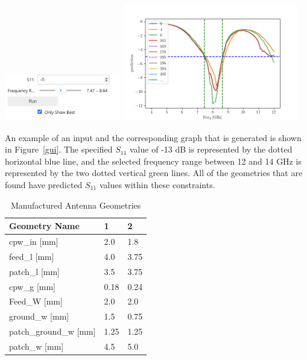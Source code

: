 \documentclass[conference]{IEEEtran}
\newenvironment{Figure}
    {\par\medskip\noindent\minipage{\linewidth}}
    {\endminipage\par\medskip}
\begin{document}
\begin{Figure}
    \centering
    \includegraphics[width=2in]{gui_input}
    \includegraphics[width=3in]{gui_graph}
    \label{gui}
\end{Figure}

An example of an input and the corresponding graph that is generated is shown in Figure~\ref{gui}. The specified $S_{11}$ value of -13 dB is represented by the dotted horizontal blue line, and the selected frequency range between 12 and 14 GHz is represented by the two dotted vertical green lines. All of the geometries that are found have predicted $S_{11}$ values within these constraints. 

\begin{table}[h]
\caption{Manufactured Antenna Geometries}
\begin{center}
\begin{tabular}{ 
|l|l|l|}
    \hline
    Geometry Name & 1 & 2 \\
    \hline
    cpw\_in [mm] & 2.0 & 1.8 \\
    \hline
    feed\_l [mm] & 4.0 & 3.75 \\
    \hline
    patch\_l [mm] & 3.5 & 3.75 \\
    \hline
    cpw\_g [mm] & 0.18 & 0.24 \\
    \hline
    Feed\_W [mm] & 2.0 & 2.0 \\
    \hline
    ground\_w [mm] & 1.5 & 0.75 \\
    \hline
    patch\_ground\_w [mm] & 1.25 & 1.25 \\
    \hline
    patch\_w [mm] & 4.5 & 5.0 \\
    \hline
\end{tabular}
\end{center}
\label{manufactured_geometries_list}
\end{table}   
\end{document}
